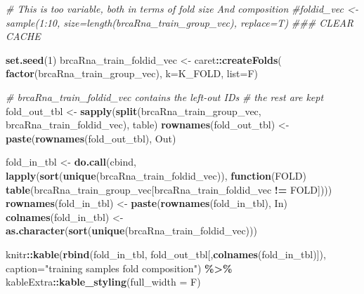 \documentclass[
]{book}
\newenvironment{Shaded}{\begin{snugshade}}{\end{snugshade}}
\newcommand{\CommentTok}[1]{\textcolor[rgb]{0.56,0.35,0.01}{\textit{#1}}}
\newcommand{\ControlFlowTok}[1]{\textcolor[rgb]{0.13,0.29,0.53}{\textbf{#1}}}
\newcommand{\DataTypeTok}[1]{\textcolor[rgb]{0.13,0.29,0.53}{#1}}
\newcommand{\DecValTok}[1]{\textcolor[rgb]{0.00,0.00,0.81}{#1}}
\newcommand{\KeywordTok}[1]{\textcolor[rgb]{0.13,0.29,0.53}{\textbf{#1}}}
\newcommand{\NormalTok}[1]{#1}
\newcommand{\OperatorTok}[1]{\textcolor[rgb]{0.81,0.36,0.00}{\textbf{#1}}}
\newcommand{\StringTok}[1]{\textcolor[rgb]{0.31,0.60,0.02}{#1}}
\begin{document}
\begin{Shaded}
\begin{Highlighting}[]
\CommentTok{\# This is too variable, both in terms of fold size And composition}
\CommentTok{\#foldid\_vec <{-} sample(1:10, size=length(brcaRna\_train\_group\_vec), replace=T)}
\CommentTok{\#\#\# CLEAR CACHE}

\KeywordTok{set.seed}\NormalTok{(}\DecValTok{1}\NormalTok{)}
\NormalTok{brcaRna\_train\_foldid\_vec <{-}}\StringTok{ }\NormalTok{caret}\OperatorTok{::}\KeywordTok{createFolds}\NormalTok{(}
 \KeywordTok{factor}\NormalTok{(brcaRna\_train\_group\_vec), }
 \DataTypeTok{k=}\NormalTok{K\_FOLD,}
 \DataTypeTok{list=}\NormalTok{F)}

\CommentTok{\# brcaRna\_train\_foldid\_vec contains the left{-}out IDs }
\CommentTok{\# the rest are kept}
\NormalTok{fold\_out\_tbl <{-}}\StringTok{ }\KeywordTok{sapply}\NormalTok{(}\KeywordTok{split}\NormalTok{(brcaRna\_train\_group\_vec, brcaRna\_train\_foldid\_vec),}
\NormalTok{  table)}
\KeywordTok{rownames}\NormalTok{(fold\_out\_tbl) <{-}}\StringTok{ }\KeywordTok{paste}\NormalTok{(}\KeywordTok{rownames}\NormalTok{(fold\_out\_tbl), }\StringTok{\textquotesingle{}{-} Out\textquotesingle{}}\NormalTok{) }

\NormalTok{fold\_in\_tbl <{-}}\StringTok{ }\KeywordTok{do.call}\NormalTok{(}\StringTok{\textquotesingle{}cbind\textquotesingle{}}\NormalTok{, }\KeywordTok{lapply}\NormalTok{(}\KeywordTok{sort}\NormalTok{(}\KeywordTok{unique}\NormalTok{(brcaRna\_train\_foldid\_vec)),}
  \ControlFlowTok{function}\NormalTok{(FOLD) }\KeywordTok{table}\NormalTok{(brcaRna\_train\_group\_vec[brcaRna\_train\_foldid\_vec }\OperatorTok{!=}\StringTok{ }\NormalTok{FOLD])))}
\KeywordTok{rownames}\NormalTok{(fold\_in\_tbl) <{-}}\StringTok{ }\KeywordTok{paste}\NormalTok{(}\KeywordTok{rownames}\NormalTok{(fold\_in\_tbl), }\StringTok{\textquotesingle{}{-} In\textquotesingle{}}\NormalTok{) }
\KeywordTok{colnames}\NormalTok{(fold\_in\_tbl) <{-}}\StringTok{ }\KeywordTok{as.character}\NormalTok{(}\KeywordTok{sort}\NormalTok{(}\KeywordTok{unique}\NormalTok{(brcaRna\_train\_foldid\_vec)))}


\NormalTok{knitr}\OperatorTok{::}\KeywordTok{kable}\NormalTok{(}\KeywordTok{rbind}\NormalTok{(fold\_in\_tbl, fold\_out\_tbl[,}\KeywordTok{colnames}\NormalTok{(fold\_in\_tbl)]),}
  \DataTypeTok{caption=}\StringTok{"training samples fold composition"}\NormalTok{) }\OperatorTok{\%>\%}
\StringTok{   }\NormalTok{kableExtra}\OperatorTok{::}\KeywordTok{kable\_styling}\NormalTok{(}\DataTypeTok{full\_width =}\NormalTok{ F)}
\end{Highlighting}
\end{Shaded}
\end{document}

